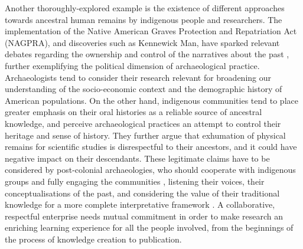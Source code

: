 		Another thoroughly-explored example is the existence of different approaches towards ancestral human remains by indigenous people and researchers. The implementation of the Native American Graves Protection and Repatriation Act (NAGPRA), and discoveries such as Kennewick Man, have sparked relevant debates regarding the ownership and control of the narratives about the past \parencite{Bruning_2006}, further exemplifying the political dimension of archaeological practice. Archaeologists tend to consider their research relevant for broadening our understanding of the socio-economic context and the demographic history of American populations. On the other hand, indigenous communities tend to place greater emphasis on their oral histories as a reliable source of ancestral knowledge, and perceive archaeological practices an attempt to control their heritage and sense of history. They further argue that exhumation of physical remains for scientific studies is disrespectful to their ancestors, and it could have negative impact on their descendants. These legitimate claims have to be considered by post-colonial archaeologies, who should cooperate with indigenous groups and fully engaging the communities \parencite{Hodder_2010}, listening their voices, their conceptualisations of the past, and considering the value of their traditional knowledge for a more complete interpretative framework \parencites{Wilcox_2010}[cf. for perspectives on archaeology in Africa:][]{Pikirayi_2015}. A collaborative, respectful enterprise needs mutual commitment in order to make research an enriching learning experience for all the people involved, from the beginnings of the process of knowledge creation to publication.
		
